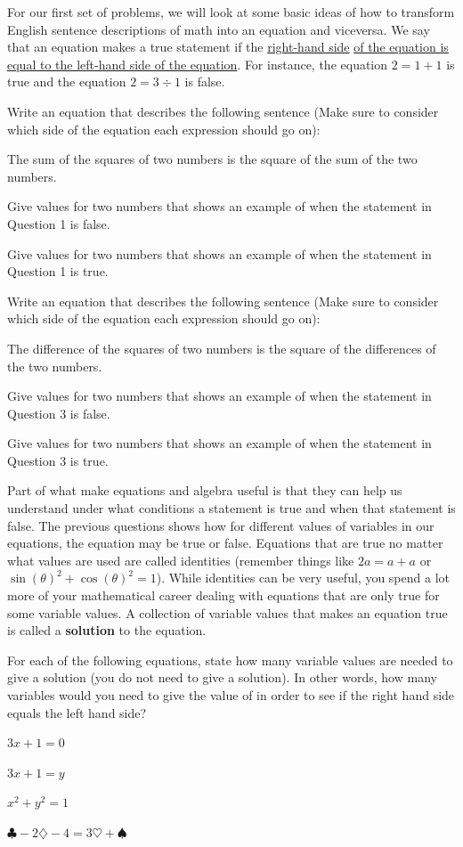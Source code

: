For our first set of problems, we will look at some basic ideas of how to transform English sentence descriptions of math into an equation and viceversa. We say that an equation makes a true statement if the \underline{right-hand side} \underline{of the equation is equal to the left-hand side of the equation}. For instance, the equation $2=1+1$ is true and the equation $2=3 \div 1$ is false.

\bq Write an equation that describes the following sentence (Make sure to consider which side of the equation each expression should go on):

The sum of the squares of two numbers is the square of the sum of the two numbers.

\eq

\bq \be
\item Give values for two numbers that shows an example of when the statement in Question 1 is false.
\item Give values for two numbers that shows an example of when the statement in Question 1 is true.
\ee \eq

\bq Write an equation that describes the following sentence (Make sure to consider which side of the equation each expression should go on):

The difference of the squares of two numbers is the square of the differences of the two numbers.
\eq

\bq \be
\item Give values for two numbers that shows an example of when the statement in Question 3 is false.
\item Give values for two numbers that shows an example of when the statement in Question 3 is true.
\ee \eq


Part of what make equations and algebra useful is that they can help us understand under what conditions a statement is true and when that statement is false. The previous questions shows how for different values of variables in our equations, the equation may be true or false. Equations that are true no matter what values are used are called identities (remember things like $2a=a+a$ or $\sin(\theta)^2 +\cos(\theta)^2=1$). While identities can be very useful, you spend a lot more of your mathematical career dealing with equations that are only true for some variable values. A collection of variable values that makes an equation true is called a \textbf{solution} to the equation.

\bq For each of the following equations, state how many variable values are needed to give a solution (you do not need to give a solution). In other words, how many variables would you need to give the value of in order to see if the right hand side equals the left hand side?
\be
\item $3x+1=0$
\item $3x+1=y$
\item $x^2+y^2=1$
\item $\clubsuit-2\diamondsuit-4=3\heartsuit+\spadesuit$
\ee
\eq

